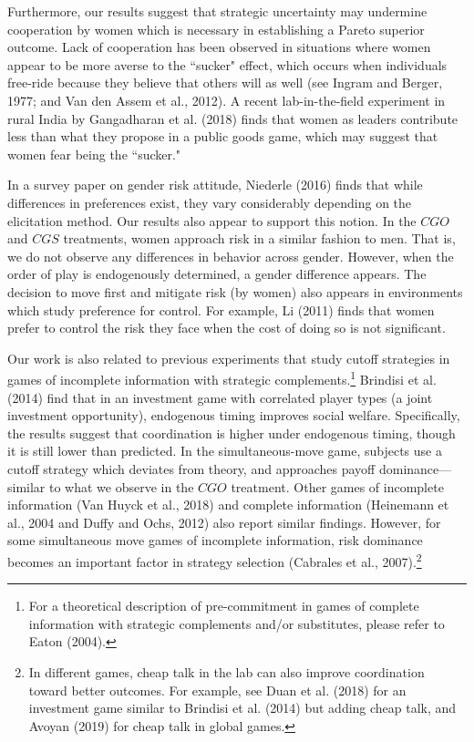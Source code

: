 \documentclass[11pt, letterpaper]{article}
\theoremstyle{plain}
\begin{document}
Furthermore, our results suggest that strategic uncertainty may undermine cooperation by women which is necessary in establishing a Pareto superior outcome. Lack of cooperation has been observed in situations where women appear to be more averse to the ``sucker" effect, which occurs when individuals free-ride because they believe that others will as well (see Ingram and Berger, 1977; and Van den Assem et al., 2012). A recent lab-in-the-field experiment in rural India by Gangadharan et al. (2018) finds that women as leaders contribute less than what they propose in a public goods game, which may suggest that women fear being the ``sucker." 


In a survey paper on gender risk attitude, Niederle (2016) finds that while differences in preferences exist, they vary considerably depending on the elicitation method. Our results also appear to support this notion. In the $CGO$ and $CGS$ treatments, women approach risk in a similar fashion to men. That is, we do not observe any differences in behavior across gender. However, when the order of play is endogenously determined, a gender difference appears. The decision to move first and mitigate risk (by women) also appears in environments which study preference for control. For example, Li (2011) finds that women prefer to control the risk they face when the cost of doing so is not significant.

Our work is also related to previous experiments that study cutoff strategies in games of incomplete information with strategic complements.\footnote{For a theoretical description of pre-commitment in games of complete information with strategic complements and/or substitutes, please refer to Eaton (2004).} Brindisi et al. (2014) find that in an investment game with correlated player types (a joint investment opportunity), endogenous timing improves social welfare. Specifically, the results suggest that coordination is higher under endogenous timing, though it is still lower than predicted. In the simultaneous-move game, subjects use a cutoff strategy which deviates from theory, and approaches payoff dominance--- similar to what we observe in the $CGO$ treatment. Other games of incomplete information (Van Huyck et al., 2018) and complete information (Heinemann et al., 2004 and Duffy and Ochs, 2012) also report similar findings. However, for some simultaneous move games of incomplete information, risk dominance becomes an important factor in strategy selection (Cabrales et al., 2007).\footnote{In different games, cheap talk in the lab can also improve coordination toward better outcomes. For example, see Duan et al. (2018) for an investment game similar to Brindisi et al. (2014) but adding cheap talk, and Avoyan (2019) for cheap talk in global games.}
\end{document}
